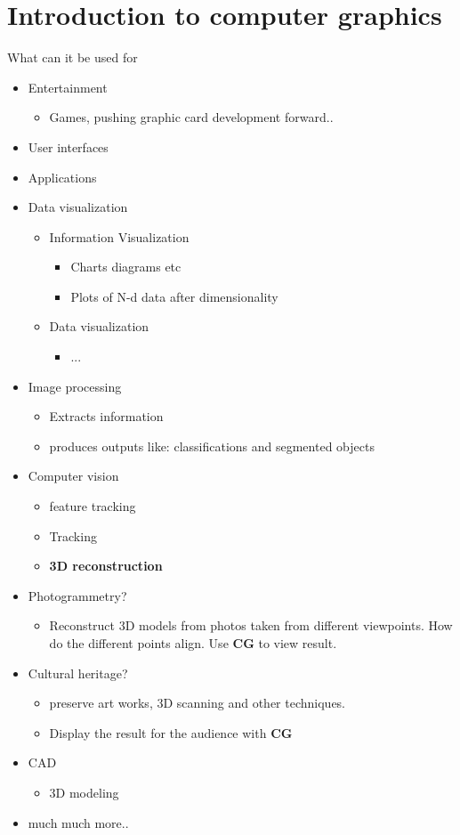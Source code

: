 \section{Introduction to computer graphics}
What can it be used for

\begin{itemize}
	\item Entertainment
	\begin{itemize}
		\item Games, pushing graphic card development forward.. 
	\end{itemize}
	\item User interfaces
	\item Applications
	\item Data visualization
	\begin{itemize}
		\item Information Visualization
		\begin{itemize}
			\item Charts diagrams etc
			\item Plots of N-d data after dimensionality
		\end{itemize}
		\item Data visualization
		\begin{itemize}
			\item ... 
		\end{itemize}

	\end{itemize}
	\item Image processing
	\begin{itemize}
		\item Extracts information
		\item produces outputs like: classifications and segmented objects
	\end{itemize}
	\item Computer vision
	\begin{itemize}
		\item feature tracking
		\item Tracking
		\item \textbf{3D reconstruction}
	\end{itemize}
	\item Photogrammetry?
	\begin{itemize}
		\item Reconstruct 3D models from photos taken from different viewpoints. How do the different points align. Use \textbf{CG} to view result. 
	\end{itemize}
	\item Cultural heritage?
	\begin{itemize}
		\item preserve art works, 3D scanning and other techniques. 
		\item Display the result for the audience with \textbf{CG}
	\end{itemize}
	\item CAD
	\begin{itemize}
		\item 3D modeling
	\end{itemize}
	\item much much more..
\end{itemize}

